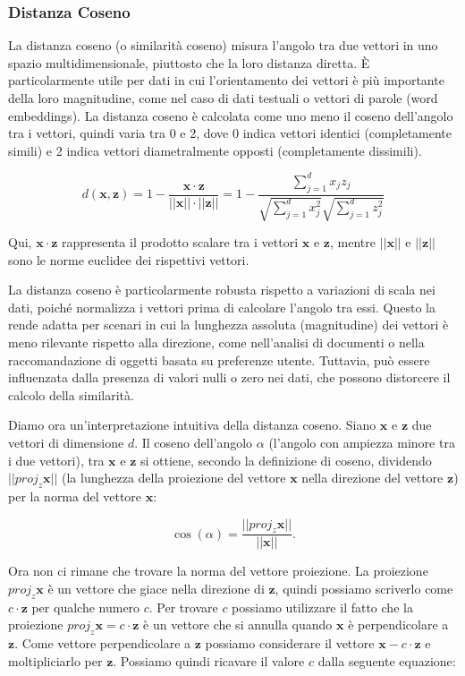 \subsubsection{Distanza Coseno} La distanza coseno (o similarità coseno) misura 
    l'angolo tra due vettori in uno spazio multidimensionale, piuttosto che la loro distanza diretta. 
    È particolarmente utile per dati in cui l'orientamento dei vettori è più importante della loro 
    magnitudine, come nel caso di dati testuali o vettori di parole (word embeddings). La distanza 
    coseno è calcolata come uno meno il coseno dell'angolo tra i vettori, quindi varia tra 0 e 2, 
    dove 0 indica vettori identici (completamente simili) e 2 indica vettori diametralmente opposti 
    (completamente dissimili).

    \[
d(\mathbf{x}, \mathbf{z}) = 1 - \frac{\mathbf{x} \cdot \mathbf{z}}{||\mathbf{x}|| \cdot ||\mathbf{z}||} = 1 - \frac{\sum_{j=1}^d x_j z_j}{\sqrt{\sum_{j=1}^d x_j^2} \sqrt{\sum_{j=1}^d z_j^2}}
\]

Qui, $\mathbf{x} \cdot \mathbf{z}$ rappresenta il prodotto scalare tra i 
vettori $\mathbf{x}$ e $\mathbf{z}$, mentre $||\mathbf{x}||$ e $||\mathbf{z}||$ sono 
le norme euclidee dei rispettivi vettori.

La distanza coseno è particolarmente robusta rispetto a variazioni di scala nei dati, 
poiché normalizza i vettori prima di calcolare l'angolo tra essi. Questo la rende adatta 
per scenari in cui la lunghezza assoluta (magnitudine) dei vettori è meno rilevante 
rispetto alla direzione, come nell'analisi di 
documenti o nella raccomandazione di oggetti basata su preferenze utente. Tuttavia, può essere 
influenzata dalla presenza di valori nulli o zero nei dati, che possono distorcere il calcolo della similarità.

Diamo ora un'interpretazione intuitiva della distanza coseno. Siano $\mathbf x$ e $\mathbf z$ 
due vettori di dimensione $d$. Il coseno dell'angolo $\alpha$ (l'angolo con ampiezza minore tra i due vettori),
tra $\mathbf x$ e $\mathbf z$ si ottiene, secondo la definizione di coseno, dividendo $||proj_z \mathbf x||$ 
(la lunghezza della 
proiezione del vettore $\mathbf x$ nella direzione del vettore $\mathbf z$) per la norma del vettore $\mathbf x$:

\begin{equation}
\cos(\alpha) = \frac{||proj_z \mathbf x||}{||\mathbf x||}.
\label{eq:cosine}
\end{equation}

Ora non ci rimane che trovare la norma del vettore proiezione. La proiezione $proj_z \mathbf x$ è
un vettore che giace nella direzione di $\mathbf z$, quindi possiamo scriverlo come
$c \cdot \mathbf z$ per qualche numero $c$. Per trovare $c$ possiamo utilizzare il fatto che la 
proiezione $proj_z \mathbf x = c \cdot \mathbf z$ è un vettore che si annulla quando $\mathbf x$ è perpendicolare
a $\mathbf z$. Come vettore perpendicolare a $\mathbf z$ possiamo considerare il vettore $\mathbf x - c \cdot \mathbf z$ 
e moltipliciarlo per $\mathbf z$. Possiamo quindi ricavare il valore $c$ dalla seguente equazione:


